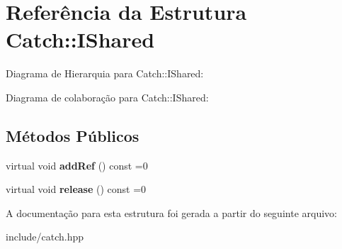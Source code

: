 \hypertarget{structCatch_1_1IShared}{}\section{Referência da Estrutura Catch\+:\+:I\+Shared}
\label{structCatch_1_1IShared}


Diagrama de Hierarquia para Catch\+:\+:I\+Shared\+:


Diagrama de colaboração para Catch\+:\+:I\+Shared\+:
\subsection*{Métodos Públicos}
\begin{DoxyCompactItemize}
\item 
virtual void {\bfseries add\+Ref} () const =0\hypertarget{structCatch_1_1IShared_ae383df68557cdaf0910b411af04d9e33}{}\label{structCatch_1_1IShared_ae383df68557cdaf0910b411af04d9e33}

\item 
virtual void {\bfseries release} () const =0\hypertarget{structCatch_1_1IShared_a002f52624728a763956fb6f230cb2f57}{}\label{structCatch_1_1IShared_a002f52624728a763956fb6f230cb2f57}

\end{DoxyCompactItemize}


A documentação para esta estrutura foi gerada a partir do seguinte arquivo\+:\begin{DoxyCompactItemize}
\item 
include/catch.\+hpp\end{DoxyCompactItemize}
